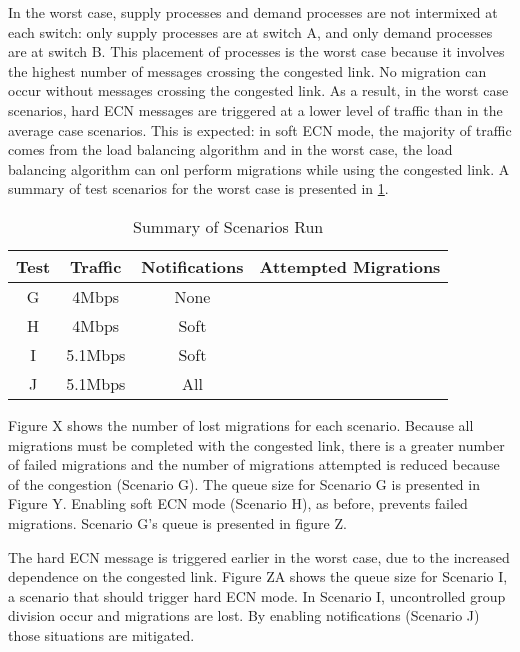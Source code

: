 In the worst case, supply processes and demand processes are not intermixed at each switch: only supply processes are at switch A, and only demand processes are at switch B.
This placement of processes is the worst case because it involves the highest number of messages crossing the congested link.
No migration can occur without messages crossing the congested link.
As a result, in the worst case scenarios, hard \ac{ECN} messages are triggered at a lower level of traffic than in the average case scenarios.
This is expected: in soft \ac{ECN} mode, the majority of traffic comes from the load balancing algorithm and in the worst case, the load balancing algorithm can onl perform migrations while using the congested link.
A summary of test scenarios for the worst case is presented in \ref{tab:scenarios-worst}.

\begin{table}
\centering
\caption{Summary of Scenarios Run}
\begin{tabular}{| c | c | c | c |}
    \hline
    Test & Traffic & Notifications & Attempted Migrations \\ \hline
    G & 4Mbps & None &  \\ \hline
    H & 4Mbps & Soft &  \\ \hline
    I & 5.1Mbps & Soft & \\ \hline
    J & 5.1Mbps & All &  \\ \hline
\end{tabular}
\label{tab:scenarios-worst}
\end{table}

Figure X shows the number of lost migrations for each scenario.
Because all migrations must be completed with the congested link, there is a greater number of failed migrations and the number of migrations attempted is reduced because of the congestion (Scenario G).
The queue size for Scenario G is presented in Figure Y.
Enabling soft ECN mode (Scenario H), as before, prevents failed migrations.
Scenario G's queue is presented in figure Z.

The hard ECN message is triggered earlier in the worst case, due to the increased dependence on the congested link.
Figure ZA shows the queue size for Scenario I, a scenario that should trigger hard ECN mode.
In Scenario I, uncontrolled group division occur and migrations are lost.
By enabling notifications (Scenario J) those situations are mitigated.
